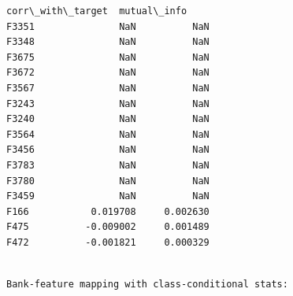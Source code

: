 \documentclass[11pt]{article}
\begin{document}
\begin{Verbatim}[commandchars=\\\{\}]
       corr\_with\_target  mutual\_info  
F3351               NaN          NaN  
F3348               NaN          NaN  
F3675               NaN          NaN  
F3672               NaN          NaN  
F3567               NaN          NaN  
F3243               NaN          NaN  
F3240               NaN          NaN  
F3564               NaN          NaN  
F3456               NaN          NaN  
F3783               NaN          NaN  
F3780               NaN          NaN  
F3459               NaN          NaN  
F166           0.019708     0.002630  
F475          -0.009002     0.001489  
F472          -0.001821     0.000329  
    \end{Verbatim}

    
    \begin{Verbatim}[commandchars=\\\{\}]

Bank-feature mapping with class-conditional stats:
    \end{Verbatim}
\end{document}
